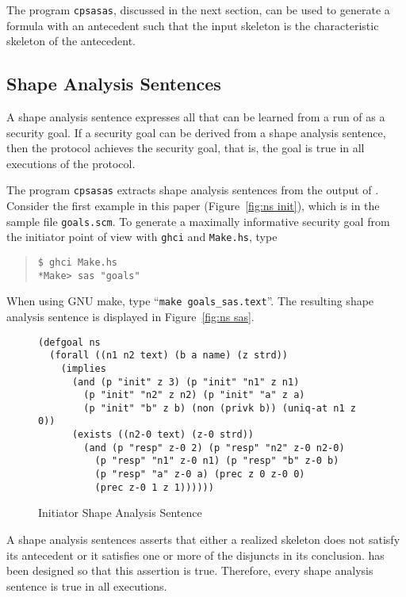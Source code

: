 \documentclass[12pt]{article}
\begin{document}
The program \texttt{cpsasas}, discussed in the next section, can be
used to generate a formula with an antecedent such that the input
skeleton is the characteristic skeleton of the antecedent.

\subsection{Shape Analysis Sentences}\label{sec:sas}

A shape analysis sentence expresses all that can be learned from a run
of {\cpsa} as a security goal.  If a security goal can be derived from
a shape analysis sentence, then the protocol achieves the security
goal, that is, the goal is true in all executions of the protocol.

The program \texttt{cpsasas} extracts shape analysis sentences from
the output of {\cpsa}.  Consider the first example in this paper
(Figure~\ref{fig:ns init}), which is in the sample file
\texttt{goals.scm}.  To generate a maximally informative security goal
from the initiator point of view with \texttt{ghci} and
\texttt{Make.hs}, type
\begin{quote}
\begin{verbatim}
$ ghci Make.hs
*Make> sas "goals"
\end{verbatim}
\end{quote}
When using GNU make, type ``\texttt{make goals\_sas.text}''.  The
resulting shape analysis sentence is displayed in Figure~\ref{fig:ns
  sas}.

\begin{figure}
\begin{verbatim}
(defgoal ns
  (forall ((n1 n2 text) (b a name) (z strd))
    (implies
      (and (p "init" z 3) (p "init" "n1" z n1)
        (p "init" "n2" z n2) (p "init" "a" z a)
        (p "init" "b" z b) (non (privk b)) (uniq-at n1 z 0))
      (exists ((n2-0 text) (z-0 strd))
        (and (p "resp" z-0 2) (p "resp" "n2" z-0 n2-0)
          (p "resp" "n1" z-0 n1) (p "resp" "b" z-0 b)
          (p "resp" "a" z-0 a) (prec z 0 z-0 0)
          (prec z-0 1 z 1))))))
\end{verbatim}
\caption{Initiator Shape Analysis Sentence}\label{fig:ns sas}
\end{figure}

A shape analysis sentences asserts that either a realized skeleton
does not satisfy its antecedent or it satisfies one or more of the
disjuncts in its conclusion.  {\cpsa} has been designed so that this
assertion is true.  Therefore, every shape analysis sentence is true
in all executions.
\end{document}
